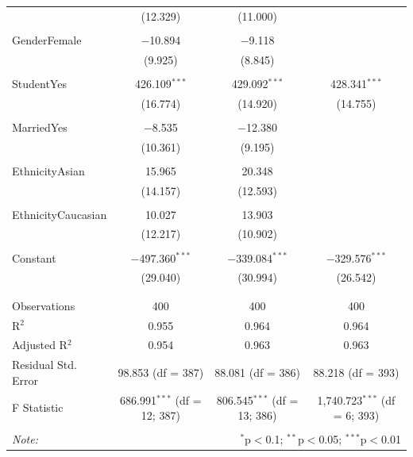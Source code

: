 \documentclass[11pt]{article}
\begin{document}
{\begin{table}[!htbp]
{\begin{tabular}{@{\extracolsep{5pt}}lccc}
  & (12.329) & (11.000) &  \\ 
  & & & \\ 
 GenderFemale & $-$10.894 & $-$9.118 &  \\ 
  & (9.925) & (8.845) &  \\ 
  & & & \\ 
 StudentYes & 426.109$^{***}$ & 429.092$^{***}$ & 428.341$^{***}$ \\ 
  & (16.774) & (14.920) & (14.755) \\ 
  & & & \\ 
 MarriedYes & $-$8.535 & $-$12.380 &  \\ 
  & (10.361) & (9.195) &  \\ 
  & & & \\ 
 EthnicityAsian & 15.965 & 20.348 &  \\ 
  & (14.157) & (12.593) &  \\ 
  & & & \\ 
 EthnicityCaucasian & 10.027 & 13.903 &  \\ 
  & (12.217) & (10.902) &  \\ 
  & & & \\ 
 Constant & $-$497.360$^{***}$ & $-$339.084$^{***}$ & $-$329.576$^{***}$ \\ 
  & (29.040) & (30.994) & (26.542) \\ 
  & & & \\ 
\hline \\[-1.8ex] 
Observations & 400 & 400 & 400 \\ 
R$^{2}$ & 0.955 & 0.964 & 0.964 \\ 
Adjusted R$^{2}$ & 0.954 & 0.963 & 0.963 \\ 
Residual Std. Error & 98.853 (df = 387) & 88.081 (df = 386) & 88.218 (df = 393) \\ 
F Statistic & 686.991$^{***}$ (df = 12; 387) & 806.545$^{***}$ (df = 13; 386) & 1,740.723$^{***}$ (df = 6; 393) \\ 
\hline 
\hline \\[-1.8ex] 
\textit{Note:}  & \multicolumn{3}{r}{$^{*}$p$<$0.1; $^{**}$p$<$0.05; $^{***}$p$<$0.01} \\ 
\end{tabular}
}
\end{table} 

}
\end{document}
